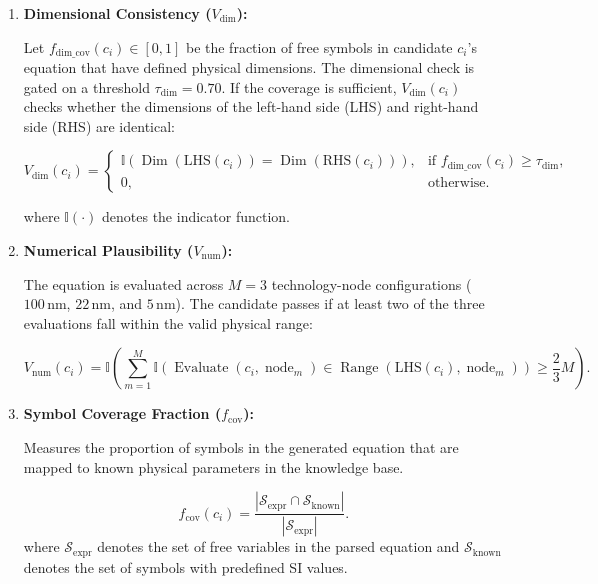 \documentclass[a4paper,fleqn]{cas-sc}
\begin{document}
\begin{enumerate}

\item \textbf{Dimensional Consistency ($V_{\mathrm{dim}}$):}

Let $f_{\mathrm{dim\_cov}}(c_i)\in[0,1]$ be the fraction of free symbols in candidate $c_i$'s equation that have defined physical dimensions. The dimensional check is gated on a threshold $\tau_{\mathrm{dim}}=0.70$. If the coverage is sufficient, $V_{\mathrm{dim}}(c_i)$ checks whether the dimensions of the left-hand side (LHS) and right-hand side (RHS) are identical:

\begin{equation*}
V_{\mathrm{dim}}(c_i)=
\begin{cases}
\mathbb{I}\left(
\operatorname{Dim}(\mathrm{LHS}(c_i))
=
\operatorname{Dim}(\mathrm{RHS}(c_i))
\right),
& \text{if } f_{\mathrm{dim\_cov}}(c_i)\ge\tau_{\mathrm{dim}},\\[6pt]
0,
& \text{otherwise.}
\end{cases}
\end{equation*}

where $\mathbb{I}(\cdot)$ denotes the indicator function.

\item \textbf{Numerical Plausibility ($V_{\mathrm{num}}$):}

The equation is evaluated across $M=3$ technology-node configurations ($100\,\mathrm{nm}$, $22\,\mathrm{nm}$, and $5\,\mathrm{nm}$). The candidate passes if at least two of the three evaluations fall within the valid physical range:

\begin{equation*}
V_{\mathrm{num}}(c_i)=
\mathbb{I}\left(
\sum_{m=1}^{M}
\mathbb{I}\left(
\operatorname{Evaluate}(c_i,\operatorname{node}_m)
\in
\operatorname{Range}(\mathrm{LHS}(c_i),\operatorname{node}_m)
\right)
\ge
\frac{2}{3}M
\right).
\end{equation*}

\item \textbf{Symbol Coverage Fraction ($f_{\mathrm{cov}}$):}

Measures the proportion of symbols in the generated equation that are mapped to known physical parameters in the knowledge base.

\begin{equation*}
f_{\mathrm{cov}}(c_i)=
\frac{
\left|\mathcal{S}_{\mathrm{expr}}
\cap
\mathcal{S}_{\mathrm{known}}\right|
}{
\left|\mathcal{S}_{\mathrm{expr}}\right|
}.
\end{equation*}
where $\mathcal{S}_{\mathrm{expr}}$ denotes the set of free variables in the parsed equation and $\mathcal{S}_{\mathrm{known}}$ denotes the set of symbols with predefined SI values.
\end{enumerate}
\end{document}
